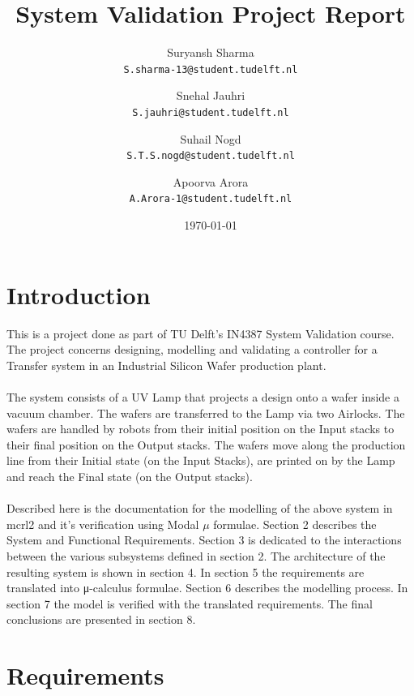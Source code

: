 \documentclass[a4paper,12pt]{article}
\begin{document}
\title{System Validation Project Report}
\author{
	Suryansh Sharma \\ 
	\texttt{S.sharma-13@student.tudelft.nl}
 	\and 
	Snehal Jauhri \\
	\texttt{S.jauhri@student.tudelft.nl} 
	\and
	Suhail Nogd \\
	\texttt{S.T.S.nogd@student.tudelft.nl} 	
	 \and 
	Apoorva Arora\\
	\texttt{A.Arora-1@student.tudelft.nl} 
}

\date {\today}
\maketitle
\newpage
\tableofcontents
 
\newpage
\section{Introduction}
This is a project done as part of TU Delft's IN4387 System Validation course. The project concerns designing, modelling and validating a controller for a Transfer system in an Industrial Silicon Wafer production plant.
\\
\\The system consists of a UV Lamp that projects a design onto a wafer inside a vacuum chamber. The wafers are transferred to the Lamp via two Airlocks. The wafers are handled by robots from their initial position on the Input stacks to their final position on the Output stacks. The wafers move along the production line from their Initial state (on the Input Stacks), are printed on by the Lamp and reach the Final state (on the Output stacks).
\\
\\Described here is the documentation for the modelling of the above system in mcrl2 and it's verification using Modal $\mu$ formulae. Section 2 describes the System and Functional Requirements. Section 3 is dedicated to the interactions between the various subsystems defined in section 2. The architecture of the resulting system is shown in section 4. In section 5 the requirements are translated into μ-calculus formulae. Section 6 describes the modelling process. In section 7 the model is verified with the translated requirements. The final conclusions are presented in section 8.

\section{Requirements}
\end{document}
